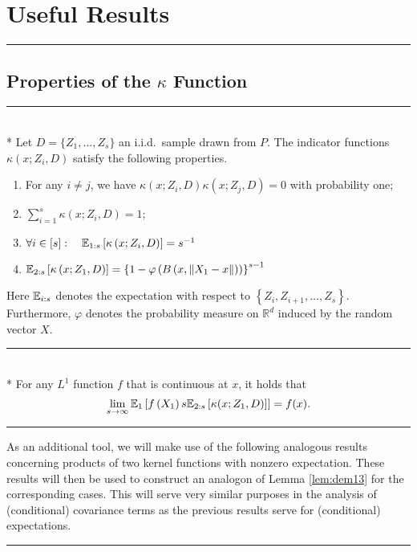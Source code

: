 \section{Useful Results}
\hrule

\subsection{Properties of the $\kappa$ Function}
\hrule

\begin{lem}\label{lem:dem12}\mbox{}\\*
	Let $D = \{Z_1, \dotsc, Z_s\}$ an i.i.d.\ sample drawn from $P$.
	The indicator functions $\kappa\left(x; Z_{i}, D\right)$ satisfy the following properties.
	\begin{enumerate}
		\item For any $i \neq j$, we have $\kappa\left(x; Z_{i}, D\right) \kappa\left(x;
			      Z_{j}, D\right)=0$ with probability one;
		\item $\sum_{i=1}^{s} \kappa\left(x; Z_{i}, D\right)=1$;
		\item $\forall i \in [s]: \quad \mathbb{E}_{1:s}\left[\kappa\left(x; Z_{i}, D\right)\right]=s^{-1}$
		\item $\mathbb{E}_{2: s}\left[\kappa\left(x; Z_1, D\right)\right]
			      = \left\{1-\varphi\left(B\left(x,\left\|X_1-x\right\|\right)\right)\right\}^{s-1}$
	\end{enumerate}
	Here $\mathbb{E}_{i: s}$ denotes the expectation with respect to $\left\{Z_{i}, Z_{i+1}, \dotsc, Z_s\right\}$.
	Furthermore, $\varphi$ denotes the probability measure on $\mathbb{R}^{d}$ induced by the random vector $X$.
\end{lem}

\hrule

\begin{lem}\label{lem:dem13}\mbox{}\\*
	For any $L^1$ function $f$ that is continuous at $x$, it holds that
	\begin{equation}
		\lim _{s \rightarrow \infty} \mathbb{E}_{1}\left[f\left(X_1\right) s \mathbb{E}_{2:s}\left[\kappa(x; Z_1, D)\right]\right]
		= f(x).
	\end{equation}
\end{lem}

\hrule

As an additional tool, we will make use of the following analogous results concerning products of two kernel functions with nonzero expectation.
These results will then be used to construct an analogon of Lemma \ref{lem:dem13} for the corresponding cases.
This will serve very similar purposes in the analysis of (conditional) covariance terms as the previous results serve for (conditional) expectations.
\vspace{0.5cm}
\hrule


